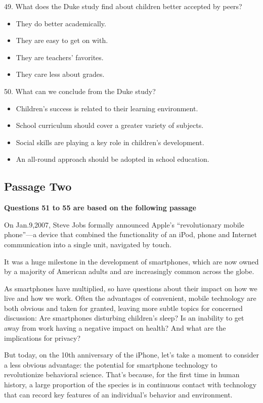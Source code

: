 \documentclass[UTF8,11pt]{ctexart}
\begin{document}
49. What does the Duke study find about children better accepted by peers?


\begin{itemize}[leftmargin=2em,itemsep=.2em,topsep=.4em]\item[A.] They do better academically.
\item[B.] They are easy to get on with.
\item[C.] They are teachers’ favorites.
\item[D.] They care less about grades.
\end{itemize}

50. What can we conclude from the Duke study?


\begin{itemize}[leftmargin=2em,itemsep=.2em,topsep=.4em]\item[A.] Children’s success is related to their learning environment.
\item[B.] School curriculum should cover a greater variety of subjects.
\item[C.] Social skills are playing a key role in children’s development.
\item[D.] An all-round approach should be adopted in school education.
\end{itemize}

\subsection*{\textbf{Passage Two}}


\textbf{Questions 51 to 55 are based on the following passage}


On Jan.9,2007, Steve Jobs formally announced Apple’s “revolutionary mobile phone”—a device that combined the functionality of an iPod, phone and Internet communication into a single unit, navigated by touch.


It was a huge milestone in the development of smartphones, which are now owned by a majority of American adults and are increasingly common across the globe.


As smartphones have multiplied, so have questions about their impact on how we live and how we work. Often the advantages of convenient, mobile technology are both obvious and taken for granted, leaving more subtle topics for concerned discussion: Are smartphones disturbing children’s sleep? Is an inability to get away from work having a negative impact on health? And what are the implications for privacy?


But today, on the 10th anniversary of the iPhone, let’s take a moment to consider a less obvious advantage: the potential for smartphone technology to revolutionize behavioral science. That’s because, for the first time in human history, a large proportion of the species is in continuous contact with technology that can record key features of an individual’s behavior and environment.
\end{document}

